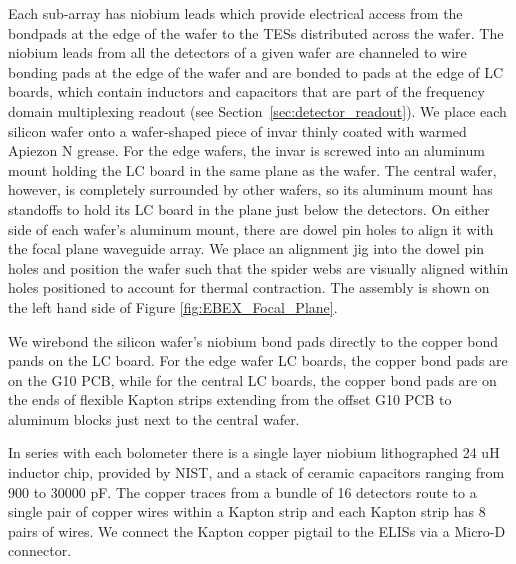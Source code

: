 \documentclass[../EBEXPaper2.tex]{subfiles}
\begin{document}
Each sub-array has niobium leads which provide electrical access from the bondpads at the edge of the wafer to the \ac{TES}s distributed across the wafer.   The niobium leads from all the detectors of a given wafer are channeled to wire bonding pads at the edge of the wafer and are bonded to pads at the edge of \ac{LC} boards, which contain inductors and capacitors that are part of the frequency domain multiplexing readout (see Section~\ref{sec:detector_readout}).  We place each silicon wafer onto a wafer-shaped piece of invar thinly coated with warmed Apiezon N grease. For the edge wafers, the invar is screwed into an aluminum mount holding the \ac{LC} board in the same plane as the wafer. The central wafer, however, is completely surrounded by other wafers, so its aluminum mount has standoffs to hold its \ac{LC} board in the plane just below the detectors. On either side of each wafer's aluminum mount, there are dowel pin holes to align it with the focal plane waveguide array. We place an alignment jig into the dowel pin holes and position the wafer such that the spider webs are visually aligned within holes positioned to account for thermal contraction. The assembly is shown on the left hand side of Figure \ref{fig:EBEX_Focal_Plane}.

We wirebond the silicon wafer's niobium bond pads directly to the copper bond pands on the \ac{LC} board. For the edge wafer \ac{LC} boards, the copper bond pads are on the G10 \ac{PCB}, while for the central \ac{LC} boards, the copper bond pads are on the ends of flexible Kapton strips extending from the offset G10 \ac{PCB} to aluminum blocks just next to the central wafer.

In series with each bolometer there is a single layer niobium lithographed 24 uH inductor chip, provided by NIST, and a stack of ceramic capacitors ranging from 900 to 30000 pF. The copper traces from a bundle of 16 detectors route to a single pair of copper wires within a Kapton strip and each Kapton strip has 8 pairs of wires. We connect the Kapton copper pigtail to the \ac{ELIS}s via a Micro-D connector.

%
\end{document}
